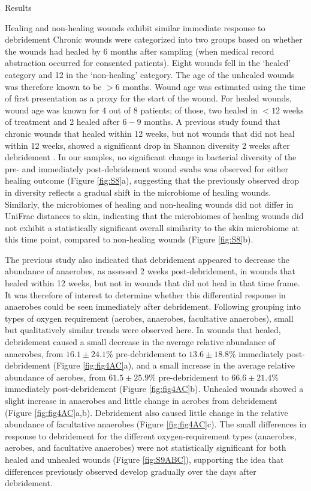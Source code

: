 \documentclass[oneside,12pt,final]{sty/ucthesis-CA2012}
\begin{document}
\begin{mainmatter}
\begin{section}{Results}
\begin{subsection}{Healing and non-healing wounds exhibit similar immediate response to debridement}
Chronic wounds were categorized into two groups based on whether the wounds had healed by 6 months after sampling (when medical record abstraction occurred for consented patients). Eight wounds fell in the ‘healed’ category and 12 in the ‘non-healing’ category. The age of the unhealed wounds was therefore known to be $>6$ months. Wound age was estimated using the time of first presentation as a proxy for the start of the wound. For healed wounds, wound age was known for 4 out of 8 patients; of those, two healed in $<12$ weeks of treatment and 2 healed after $6-9$ months. A previous study found that chronic wounds that healed within 12 weeks, but not wounds that did not heal within 12 weeks, showed a significant drop in Shannon diversity 2 weeks after debridement \cite{RN8}. In our samples, no significant change in bacterial diversity of the pre- and immediately post-debridement wound swabs was observed for either healing outcome (Figure \ref{fig:S8}a), suggesting that the previously observed drop in diversity reflects a gradual shift in the microbiome of healing wounds. Similarly, the microbiomes of healing and non-healing wounds did not differ in UniFrac distances to skin, indicating that the microbiomes of healing wounds did not exhibit a statistically significant overall similarity to the skin microbiome at this time point, compared to non-healing wounds (Figure \ref{fig:S8}b). 

The previous study \cite{RN8} also indicated that debridement appeared to decrease the abundance of anaerobes, as assessed 2 weeks post-debridement, in wounds that healed within 12 weeks, but not in wounds that did not heal in that time frame. It was therefore of interest to determine whether this differential response in anaerobes could be seen immediately after debridement. Following grouping into types of oxygen requirement (aerobes, anaerobes, facultative anaerobes), small but qualitatively similar trends were observed here. In wounds that healed, debridement caused a small decrease in the average relative abundance of anaerobes, from $16.1\pm24.1$\% pre-debridement to $13.6\pm18.8$\% immediately post-debridement (Figure \ref{fig:fig4AC}a), and a small increase in the average relative abundance of aerobes, from $61.5\pm25.9$\% pre-debridement to $66.6\pm21.4$\% immediately post-debridement (Figure \ref{fig:fig4AC}b). Unhealed wounds showed a slight increase in anaerobes and little change in aerobes from debridement (Figure \ref{fig:fig4AC}a,b). Debridement also caused little change in the relative abundance of facultative anaerobes (Figure \ref{fig:fig4AC}c). The small differences in response to debridement for the different oxygen-requirement types (anaerobes, aerobes, and facultative anaerobes) were not statistically significant for both healed and unhealed wounds (Figure \ref{fig:S9ABC}), supporting the idea that differences previously observed develop gradually over the days after debridement. 


\end{subsection}
\end{section}
\end{mainmatter}
\end{document}
